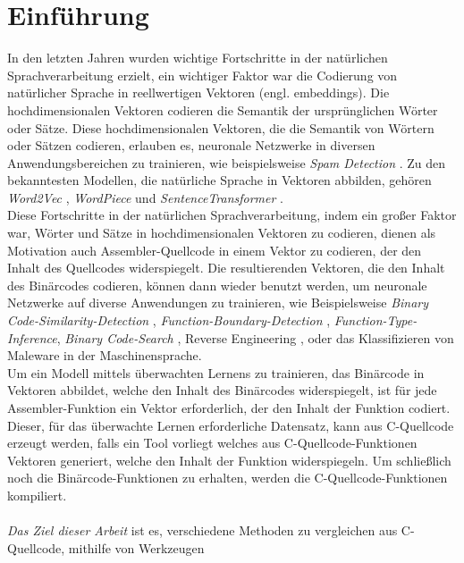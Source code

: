 \documentclass[12pt,letterpaper,ngerman]{article}
\begin{document}
\section{Einführung}
In den letzten Jahren wurden wichtige Fortschritte in der natürlichen
Sprachverarbeitung erzielt, ein wichtiger Faktor war die Codierung von
natürlicher Sprache in reellwertigen Vektoren (engl. embeddings). Die 
hochdimensionalen Vektoren
codieren die Semantik der ursprünglichen Wörter oder Sätze.
Diese hochdimensionalen Vektoren, die die Semantik von
Wörtern oder Sätzen codieren, erlauben es, neuronale
Netzwerke in diversen Anwendungsbereichen zu trainieren,
wie beispielsweise \textit{Spam Detection} \cite{Ball2019}.  
Zu den bekanntesten Modellen, die natürliche Sprache in Vektoren abbilden, gehören 
\textit{Word2Vec} \cite{word2vec},
\textit{WordPiece} \cite{wu2016googlesneuralmachinetranslation} und
\textit{SentenceTransformer} \cite{reimers-2019-sentence-bert}.\\
Diese Fortschritte in der natürlichen Sprachverarbeitung, indem
ein großer Faktor war, Wörter und Sätze in hochdimensionalen 
Vektoren zu codieren, dienen als Motivation auch 
Assembler-Quellcode in einem Vektor zu codieren, der den Inhalt
des Quellcodes widerspiegelt. Die resultierenden Vektoren, die 
den Inhalt des Binärcodes codieren, können dann wieder benutzt 
werden, um neuronale Netzwerke auf diverse Anwendungen zu 
trainieren, wie Beispielsweise
\textit{Binary Code-Similarity-Detection} \cite{jtrans},
\textit{Function-Boundary-Detection} \cite{190918},
\textit{Function-Type-Inference}\cite{203650},
\textit{Binary Code-Search} \cite{9345532},
Reverse Engineering \cite{reverse-engeneering},
oder das Klassifizieren von 
Maleware in der Maschinensprache\cite{maleware-detection}.\\
Um ein Modell mittels überwachten Lernens zu trainieren, das
Binärcode in Vektoren abbildet, welche den Inhalt des 
Binärcodes widerspiegelt, ist für jede Assembler-Funktion
ein Vektor erforderlich, der den Inhalt der Funktion codiert.
Dieser, für das überwachte Lernen erforderliche Datensatz,
kann aus C-Quellcode erzeugt werden, falls ein Tool vorliegt
welches aus C-Quellcode-Funktionen Vektoren generiert,
welche den Inhalt der Funktion widerspiegeln. Um schließlich 
noch die Binärcode-Funktionen zu erhalten, werden die 
C-Quellcode-Funktionen kompiliert.\\\\
\textit{Das Ziel dieser Arbeit} ist es, verschiedene Methoden 
zu vergleichen aus C-Quellcode, mithilfe von Werkzeugen 
\end{document}
